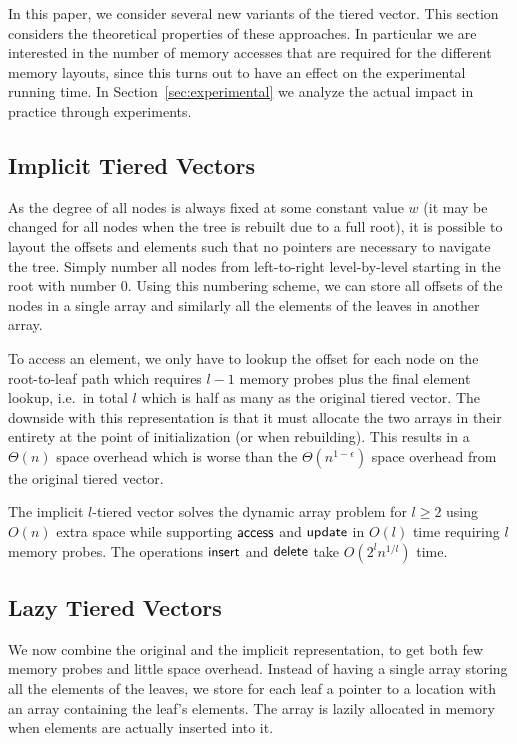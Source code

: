 
In this paper, we consider several new variants of the tiered vector. This section considers the theoretical
properties of these approaches. In particular we are interested in the number of memory accesses that are required for the different memory layouts, since this turns out to have an effect on the experimental running time.
In Section~\ref{sec:experimental} we analyze the actual impact in practice through experiments.

\subsection{Implicit Tiered Vectors}

As the degree of all nodes is always fixed at some constant value $w$ (it may be
changed for all nodes when the tree is rebuilt due to a full root), it is possible to layout the
offsets and elements such that no pointers are necessary to navigate the
tree. Simply number all nodes from left-to-right level-by-level starting in the
root with number 0. Using this numbering scheme, we can store all
offsets of the nodes in a single array and similarly all the elements of the leaves in another array.

To access an element, we only have to lookup the offset for each
node on the root-to-leaf path which requires $l-1$ memory probes plus the final
element lookup, i.e.\ in total $l$ which is half as many as
the original tiered vector.
 The downside with this representation is that it must allocate the
two arrays in their entirety at the point of initialization (or when rebuilding). This results in a $\Theta(n)$ space overhead which is worse than the $\Theta(n^{1-\epsilon})$ space overhead from the original tiered vector.

\begin{theorem} The implicit $l$-tiered vector solves the dynamic array problem for $l \geq 2$
using $O(n)$ extra space while supporting $\mathsf{access}$ and $\mathsf{update}$ in
$O(l)$ time requiring $l$ memory probes. The operations $\mathsf{insert}$ and
$\mathsf{delete}$ take $O(2^l n^{1/l})$ time.
\label{thm:implicit}
\end{theorem}

\subsection{Lazy Tiered Vectors}

We now combine the original and the implicit representation, to get both few memory probes and little space overhead. Instead of having a single array storing all
the elements of the leaves, we store for each leaf a pointer to a location with an array containing the leaf's elements. The array is lazily allocated in memory when elements are actually inserted into it.

